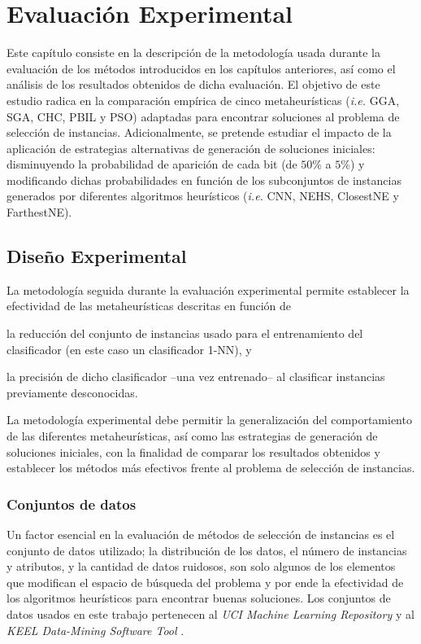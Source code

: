 \chapter{Evaluación Experimental}
\label{capitulo4}

Este capítulo consiste en la descripción de la metodología usada durante la evaluación de los métodos introducidos en los capítulos anteriores, así como el análisis de los resultados obtenidos de dicha evaluación. El objetivo de este estudio radica en la comparación empírica de cinco metaheurísticas (\emph{i.e.} GGA, SGA, CHC, PBIL y PSO) adaptadas para encontrar soluciones al problema de selección de instancias. Adicionalmente, se pretende estudiar el impacto de la aplicación de estrategias alternativas de generación de soluciones iniciales: disminuyendo la probabilidad de aparición de cada bit (de $50\%$ a $5\%$) y modificando dichas probabilidades en función de los subconjuntos de instancias generados por diferentes algoritmos heurísticos (\emph{i.e.} CNN, NEHS, ClosestNE y FarthestNE).

\section{Diseño Experimental}

La metodología seguida durante la evaluación experimental permite establecer la efectividad de las metaheurísticas descritas en función de
\begin{inparaenum}
\item la reducción del conjunto de instancias usado para el entrenamiento del clasificador (en este caso un clasificador 1-NN), y
\item la precisión de dicho clasificador --una vez entrenado-- al clasificar instancias previamente desconocidas.
\end{inparaenum}
La metodología experimental debe permitir la generalización del comportamiento de las diferentes metaheurísticas, así como las estrategias de generación de soluciones iniciales, con la finalidad de comparar los resultados obtenidos y establecer los métodos más efectivos frente al problema de selección de instancias.

\subsection{Conjuntos de datos}

Un factor esencial en la evaluación de métodos de selección de instancias es el conjunto de datos utilizado; la distribución de los datos, el número de instancias y atributos, y la cantidad de datos ruidosos, son solo algunos de los elementos que modifican el espacio de búsqueda del problema y por ende la efectividad de los algoritmos heurísticos para encontrar buenas soluciones. Los conjuntos de datos usados en este trabajo pertenecen al \emph{UCI Machine Learning Repository} \cite{BacheLichman:2013} y al \emph{KEEL Data-Mining Software Tool} \cite{alcala2010keel}.

